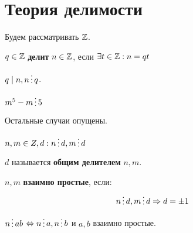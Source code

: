 

\cfoot{}



\section*{Теория делимости}

Будем рассматривать \(\mathbb{Z}\).

\begin{definition}
    \(q \in \mathbb{Z}\) \textbf{делит} \(n \in \mathbb{Z}\), если \(\exists t \in \mathbb{Z} : n = qt\)
\end{definition}
\begin{obozn}
    \(q \mid n, n \divided q\).
\end{obozn}

\begin{example}
    \(m^5 - m \divided 5\)
\end{example}
\begin{solution}
    \begin{caseof}
    \end{caseof}
    Остальные случаи опущены.
\end{solution}
\begin{definition}
    \(n, m \in Z, d : n \divided d, m \divided d\)

    \(d\) называется \textbf{общим делителем} \(n, m\).
\end{definition}
\begin{definition}
    \(n, m\) \textbf{взаимно простые}, если:
    \[n \divided d, m \divided d \Rightarrow d = \pm 1\]
\end{definition}
\begin{theorem}
    \(n \divided ab\) \(\Leftrightarrow n \divided a, n \divided b\) и \(a, b\) взаимно простые.
\end{theorem}

